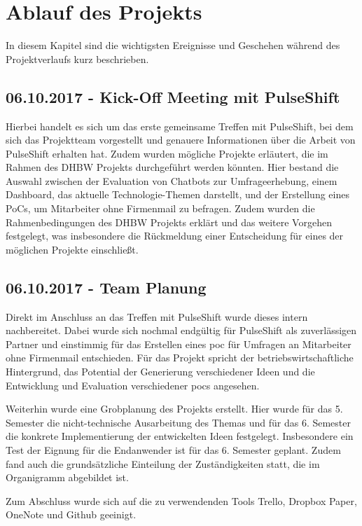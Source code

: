 \section{Ablauf des Projekts}

In diesem Kapitel sind die wichtigsten Ereignisse und Geschehen während des Projektverlaufs kurz beschrieben.

\subsection{06.10.2017 - Kick-Off Meeting mit PulseShift}
Hierbei handelt es sich um das erste gemeinsame Treffen mit PulseShift, bei dem sich das Projektteam vorgestellt und genauere Informationen über die Arbeit von PulseShift erhalten hat. Zudem wurden mögliche Projekte erläutert, die im Rahmen des DHBW Projekts durchgeführt werden könnten. Hier bestand die Auswahl zwischen der Evaluation von Chatbots zur Umfrageerhebung, einem Dashboard, das aktuelle Technologie-Themen darstellt, und der Erstellung eines PoCs, um Mitarbeiter ohne Firmenmail zu befragen. Zudem wurden die Rahmenbedingungen des DHBW Projekts erklärt und das weitere Vorgehen festgelegt, was insbesondere die Rückmeldung einer Entscheidung für eines der möglichen Projekte einschließt.

\subsection{06.10.2017 - Team Planung}
Direkt im Anschluss an das Treffen mit PulseShift wurde dieses intern nachbereitet. Dabei wurde sich nochmal endgültig für PulseShift als zuverlässigen Partner und einstimmig für das Erstellen eines \gls{poc} für Umfragen an Mitarbeiter ohne Firmenmail entschieden. Für das Projekt spricht der betriebswirtschaftliche Hintergrund, das Potential der Generierung verschiedener Ideen und die Entwicklung und Evaluation verschiedener \gls{poc}s angesehen.

Weiterhin wurde eine Grobplanung des Projekts erstellt. Hier wurde für das 5. Semester die nicht-technische Ausarbeitung des Themas und für das 6. Semester die konkrete Implementierung der entwickelten Ideen festgelegt. Insbesondere ein Test der Eignung für die Endanwender ist für das 6. Semester geplant. Zudem fand auch die grundsätzliche Einteilung der Zuständigkeiten statt, die im Organigramm abgebildet ist.

Zum Abschluss wurde sich auf die zu verwendenden Tools Trello, Dropbox Paper, OneNote und Github geeinigt.

